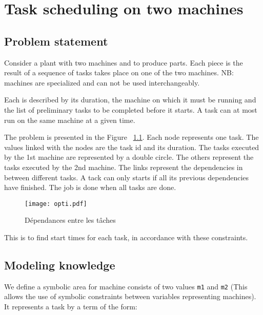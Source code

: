 \chapter{Task scheduling on two machines}


\section{Problem statement}
\label{sec:enonce-du-probleme}

Consider a plant with two machines and to produce
parts. Each piece is the result of a sequence of tasks
takes place on one of the two machines. NB: machines are
specialized and can not be used interchangeably.


Each is described by its duration, the machine on which it
must be running and the list of preliminary tasks to be
completed before it starts. A task can at most
run on the same machine at a given time.

The problem is presented in the Figure ~\ref{opti}. Each node
represents one task. The values linked with the nodes are the task id and its duration. The tasks executed by the 1st machine are represented by a double circle. The others represent the tasks executed by the 2nd machine. The links represent the dependencies in between different tasks. A tack can only starts if all its previous dependencies have finished. The job is done when all tasks are done.

\begin{figure}
\begin{center}
\texttt{[image: opti.pdf]}
\caption{Dépendances entre les tâches}
\label{opti}
\end{center}
\end{figure}

This is to find start times for each task, in accordance with these constraints.
\section{Modeling knowledge}
\label{sec:modelisation-connaissance}
We define a symbolic area for machine consists of two
values \verb|m1| and \verb|m2| (This allows the use of
symbolic constraints between variables representing
machines).
It represents a task by a term of the form:

